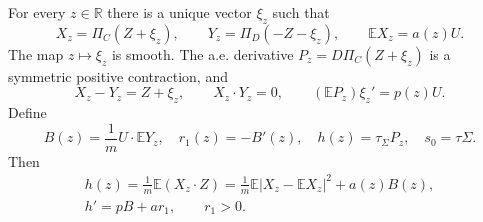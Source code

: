 \begin{lemma}\label{lem:biased-projections}
For every \(z\in\mathbb R\) there is a unique vector \(\xi_z\) such that
\[
X_z=\Pi_C(Z+\xi_z),\qquad Y_z=\Pi_D(-Z-\xi_z),\qquad
\mathbb EX_z=a(z)U.\tag{5}\label{eq:5}
\]
The map \(z\mapsto\xi_z\) is smooth. The a.e. derivative
\(P_z=D\Pi_C(Z+\xi_z)\) is a symmetric positive contraction, and
\[
X_z-Y_z=Z+\xi_z,\qquad X_z\cdot Y_z=0,\qquad
(\mathbb EP_z)\xi_z'=p(z)U.
\]
Define
\[
B(z)=\frac1m U\cdot\mathbb EY_z,\quad r_1(z)=-B'(z),\quad
h(z)=\tau_\Sigma P_z,\quad s_0=\tau\Sigma.
\]
Then
\[
\begin{gathered}
h(z)=\frac1m\mathbb E(X_z\cdot Z)
=\frac1m\mathbb E|X_z-\mathbb EX_z|^2+a(z)B(z),\\
h'=pB+ar_1,\qquad r_1>0.
\end{gathered}\tag{6}\label{eq:6}
\]
\end{lemma}
